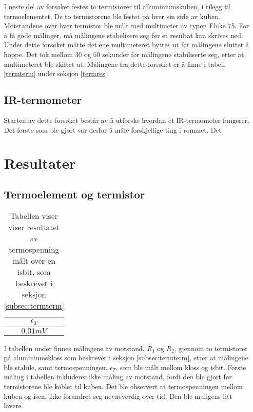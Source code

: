 \documentclass[a4paper,norsk,12pt,oneside]{article}
\begin{document}
I neste del av forsøket festes to termistorer til alluminiumskuben, i tilegg til 
termoelementet. De to termistorene ble festet på hver sin side av kuben. Motstandene over 
hver termistor ble målt med multimeter av typen Fluke 75. For å få gode målinger, må 
målingene stabelisere seg før et resultat kan skrives ned. Under dette forsøket måtte 
det ene multimeteret byttes ut før målingene sluttet å hoppe. Det tok mellom 30 og 
60 sekunder før målingene stabiliserte seg, etter at multimeteret ble skiftet ut. 
Målingene fra dette forsøket er å finne i tabell \ref{termterm} under seksjon
\ref{termres}. 

\subsection{IR-termometer}

Starten av dette forsøket består av å utforske hvordan et IR-termometer fungerer. Det 
første som ble gjort var derfor å måle forskjellige ting i rommet. Det 



\section{Resultater}

\subsection{Termoelement og termistor}\label{subsec:termres}

\begin{table}[H]  
  \begin{center}
      \caption{Tabellen viser viser resultatet av termospenning målt over en isbit, som 
          beskrevet i seksjon \ref{subsec:termterm} \label{tab:isbit}}
  \begin{tabular}{|c|} \hline
      \textbf{\(\epsilon_T\)} \\ \hline
  \(0.01 mV\)\\ \hline
  \end{tabular}
  \end{center}
\end{table}  

I tabellen under finnes målingene av motstand, \(R_1\) og \(R_2\), gjennom to termistorer 
på aluminiumskloss som beskrevet i seksjon \ref{subsec:termterm}, etter at målingene ble 
stabile, samt termospenningen, \(\epsilon_T\), som ble målt mellom kloss og isbit. Første 
måling i tabellen inkluderer ikke måling av motstand, fordi den ble gjort før termistorene 
ble koblet til kuben. Det ble observert at termospenningen mellom kuben og isen, ikke 
forandret seg nevneverdig over tid. Den ble muligens litt lavere. 
\end{document}
